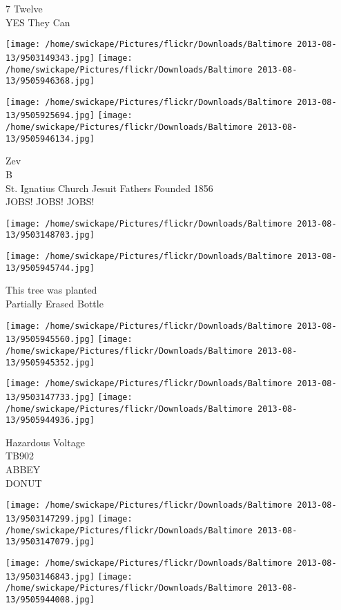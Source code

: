\documentclass[10pt,letterpaper]{article}
\begin{document}
7 Twelve\\
YES They Can\\
\pagebreak

\texttt{[image: /home/swickape/Pictures/flickr/Downloads/Baltimore 2013-08-13/9503149343.jpg]}
\texttt{[image: /home/swickape/Pictures/flickr/Downloads/Baltimore 2013-08-13/9505946368.jpg]}

\texttt{[image: /home/swickape/Pictures/flickr/Downloads/Baltimore 2013-08-13/9505925694.jpg]}
\texttt{[image: /home/swickape/Pictures/flickr/Downloads/Baltimore 2013-08-13/9505946134.jpg]}

Zev\\
B\\
St. Ignatius Church Jesuit Fathers Founded 1856\\
JOBS! JOBS! JOBS!\\
\pagebreak

\texttt{[image: /home/swickape/Pictures/flickr/Downloads/Baltimore 2013-08-13/9503148703.jpg]}

\vspace{0.25in}
\texttt{[image: /home/swickape/Pictures/flickr/Downloads/Baltimore 2013-08-13/9505945744.jpg]}

This tree was planted\\
Partially Erased Bottle\\
\pagebreak

\texttt{[image: /home/swickape/Pictures/flickr/Downloads/Baltimore 2013-08-13/9505945560.jpg]}
\texttt{[image: /home/swickape/Pictures/flickr/Downloads/Baltimore 2013-08-13/9505945352.jpg]}

\texttt{[image: /home/swickape/Pictures/flickr/Downloads/Baltimore 2013-08-13/9503147733.jpg]}
\texttt{[image: /home/swickape/Pictures/flickr/Downloads/Baltimore 2013-08-13/9505944936.jpg]}

Hazardous Voltage\\
TB902\\
ABBEY\\
DONUT\\
\pagebreak

\texttt{[image: /home/swickape/Pictures/flickr/Downloads/Baltimore 2013-08-13/9503147299.jpg]}
\texttt{[image: /home/swickape/Pictures/flickr/Downloads/Baltimore 2013-08-13/9503147079.jpg]}

\texttt{[image: /home/swickape/Pictures/flickr/Downloads/Baltimore 2013-08-13/9503146843.jpg]}
\texttt{[image: /home/swickape/Pictures/flickr/Downloads/Baltimore 2013-08-13/9505944008.jpg]}
\end{document}
